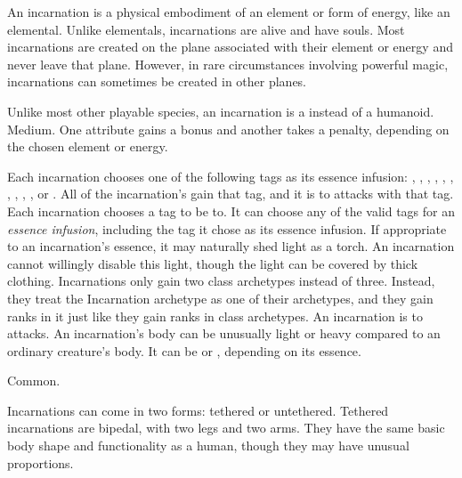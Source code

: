  An incarnation is a physical embodiment of an element or form of energy, like an elemental.
  Unlike elementals, incarnations are alive and have souls.
  Most incarnations are created on the plane associated with their element or energy and never leave that plane.
  However, in rare circumstances involving powerful magic, incarnations can sometimes be created in other planes.

   Unlike most other playable species, an incarnation is a    instead of a  humanoid.
   Medium.
   One attribute gains a  bonus and another takes a  penalty, depending on the chosen element or energy.
  \begin{raggeditemize}
     Each incarnation chooses one of the following tags as its essence infusion: \atAcid, \atAir, \atAuditory, \atCold, \atCompulsion, \atEarth, \atEmotion, \atElectricity, \atFire, \atVisual, or \atWater.
      All of the incarnation's  gain that tag, and it is \resistant to attacks with that tag.
     Each incarnation chooses a tag to be \vulnerable to.
      It can choose any of the valid tags for an \textit{essence infusion}, including the tag it chose as its essence infusion.
     If appropriate to an incarnation's essence, it may naturally shed light as a torch.
      An incarnation cannot willingly disable this light, though the light can be covered by thick clothing.
     Incarnations only gain two class archetypes instead of three.
      Instead, they treat the Incarnation archetype as one of their archetypes, and they gain ranks in it just like they gain ranks in class archetypes.
     An incarnation is \resistant to \atPoison attacks.
     An incarnation's body can be unusually light or heavy compared to an ordinary creature's body.
      It can be  or , depending on its essence.
  \end{raggeditemize}
   Common.

  Incarnations can come in two forms: tethered or untethered.
  Tethered incarnations are bipedal, with two legs and two arms.
  They have the same basic body shape and functionality as a human, though they may have unusual proportions.

